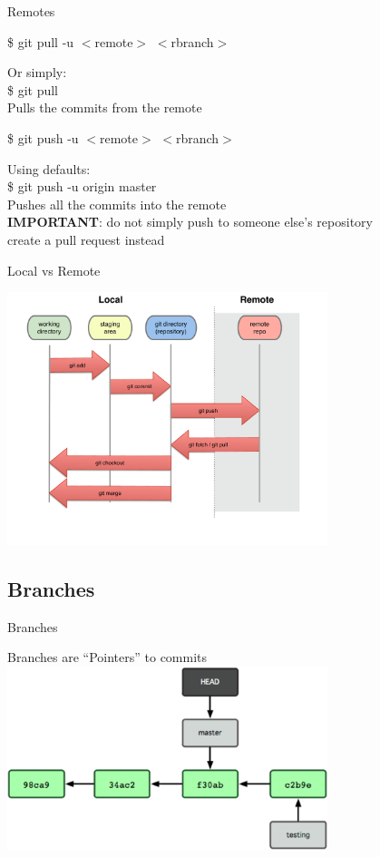 \documentclass[10pt,xcolor=dvipsnames]{beamer}
\begin{document}
\begin{frame}{Remotes}

\begin{block}{}
\$ git pull -u $<$remote$>$ $<$rbranch$>$
\end{block}
Or simply:\\
\$ git pull\\
Pulls the commits from the remote\\[0.2in]

\begin{block}{}
\$ git push -u $<$remote$>$ $<$rbranch$>$
\end{block}
Using defaults:\\
\$ git push -u origin master\\
Pushes all the commits into the remote\\[0.2in]
{\bf IMPORTANT}: do not simply push to someone else's repository\\
create a pull request instead
\end{frame}


\begin{frame}{Local vs Remote}
\begin{center}
\includegraphics[width = 0.7\textwidth]{diagrams-lifecycle_remote.pdf}
\end{center}
\end{frame}

\subsection{Branches}

\begin{frame}{Branches}
\begin{center}
Branches are ``Pointers'' to commits
\includegraphics[width = 0.7\textwidth]{branch1.png}
\end{center}
\end{frame}
\end{document}
